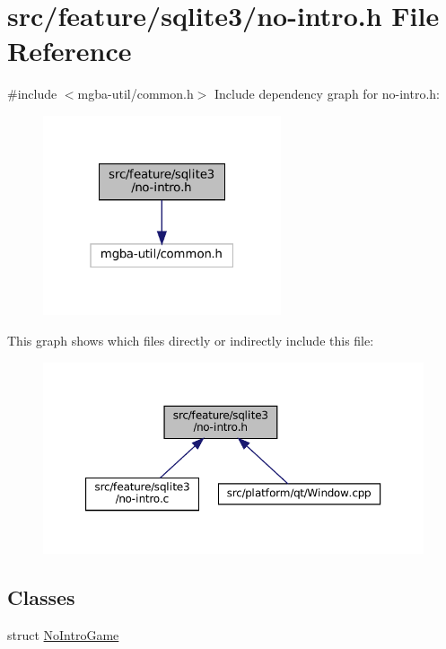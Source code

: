 \hypertarget{no-intro_8h}{}\section{src/feature/sqlite3/no-\/intro.h File Reference}
\label{no-intro_8h}
{\ttfamily \#include $<$mgba-\/util/common.\+h$>$}\newline
Include dependency graph for no-\/intro.h\+:
\nopagebreak
\begin{figure}[H]
\begin{center}
\leavevmode
\includegraphics[width=199pt]{no-intro_8h__incl}
\end{center}
\end{figure}
This graph shows which files directly or indirectly include this file\+:
\nopagebreak
\begin{figure}[H]
\begin{center}
\leavevmode
\includegraphics[width=350pt]{no-intro_8h__dep__incl}
\end{center}
\end{figure}
\subsection*{Classes}
\begin{DoxyCompactItemize}
\item 
struct \mbox{\hyperlink{no-intro_8h_struct_no_intro_game}{No\+Intro\+Game}}
\end{DoxyCompactItemize}

